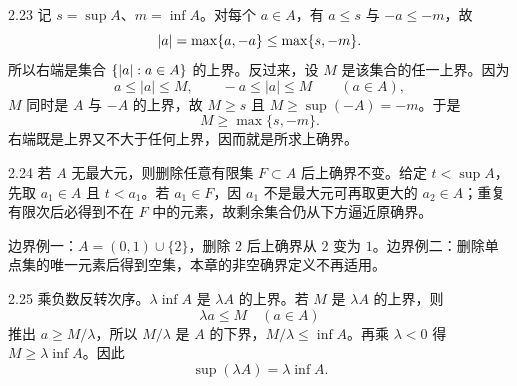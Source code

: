 \begin{solution}{2.23}
记 \(s=\sup A\)、\(m=\inf A\)。对每个 \(a\in A\)，有 \(a\le s\) 与 \(-a\le-m\)，故
\[
 \left|a\right|=\max\{a,-a\}\le\max\{s,-m\}.
\]
所以右端是集合 \(\{\left|a\right|:a\in A\}\) 的上界。反过来，设 \(M\) 是该集合的任一上界。因为
\[
  a\le |a|\le M,\qquad -a\le |a|\le M\qquad(a\in A),
\]
\(M\) 同时是 \(A\) 与 \(-A\) 的上界，故 \(M\ge s\) 且
\(M\ge\sup(-A)=-m\)。于是
\[
  M\ge\max\{s,-m\}.
\]
右端既是上界又不大于任何上界，因而就是所求上确界。
\end{solution}

\begin{solution}{2.24}
若 \(A\) 无最大元，则删除任意有限集 \(F\subset A\) 后上确界不变。给定 \(t<\sup A\)，先取 \(a_1\in A\) 且 \(t<a_1\)。若 \(a_1\in F\)，因 \(a_1\) 不是最大元可再取更大的 \(a_2\in A\)；重复有限次后必得到不在 \(F\) 中的元素，故剩余集合仍从下方逼近原确界。

边界例一：\(A=(0,1)\cup\{2\}\)，删除 \(2\) 后上确界从 \(2\) 变为 \(1\)。边界例二：删除单点集的唯一元素后得到空集，本章的非空确界定义不再适用。
\end{solution}

\begin{solution}{2.25}
乘负数反转次序。\(\lambda\inf A\) 是 \(\lambda A\) 的上界。若 \(M\) 是 \(\lambda A\) 的上界，则
\[
 \lambda a\le M\quad(a\in A)
\]
推出 \(a\ge M/\lambda\)，所以 \(M/\lambda\) 是 \(A\) 的下界，\(M/\lambda\le\inf A\)。再乘 \(\lambda<0\) 得 \(M\ge\lambda\inf A\)。因此
\[
 \sup(\lambda A)=\lambda\inf A.
\]
\end{solution}

